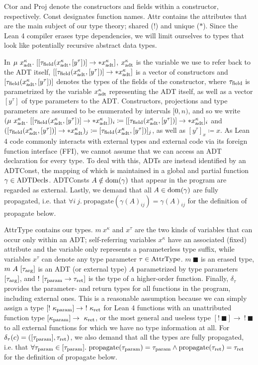 Ctor and Proj denote the constructors and fields within a constructor, respectively. Const designates function names. Attr contains the attributes that are the main subject of our type theory; shared (!) and unique ($*$). Since the Lean 4 compiler erases type dependencies, we will limit ourselves to types that look like potentially recursive abstract data types.

\sloppy In $\mu\ x^\kappa_\adt.\ [[\tau_\field(x^\kappa_\adt, [y^\tau])] \to *x^\kappa_\adt]$, $x^\kappa_{\mathrm{adt}}$ is the variable we use to refer back to the ADT itself, $[[\tau_{\mathrm{field}}(x^\kappa_{\mathrm{adt}}, [y^\tau])] \to *x^\kappa_{\mathrm{adt}}]$ is a vector of constructors and $[\tau_{\mathrm{field}}(x^\kappa_{\mathrm{adt}}, [y^\tau])]$ denotes the types of the fields of the constructor, where $\tau_{\mathrm{field}}$ is parametrized by the variable $x^\kappa_{\mathrm{adt}}$ representing the ADT itself, as well as a vector $[y^\tau]$ of type parameters to the ADT. Constructors, projections and type parameters are assumed to be enumerated by intervals $[0, n)$, and so we write $(\mu\ x^\kappa_\adt.\ [[\tau_\field(x^\kappa_\adt, [y^\tau])] \to *x^\kappa_\adt])_i \coloneqq [[\tau_\field(x^\kappa_\adt, [y^\tau])] \to *x^\kappa_\adt]_i$ and $([\tau_{\mathrm{field}}(x^\kappa_{\mathrm{adt}}, [y^\tau])] \to *x^\kappa_{\mathrm{adt}})_j \coloneqq [\tau_{\mathrm{field}}(x^\kappa_{\mathrm{adt}}, [y^\tau])]_j$, as well as $[y^\tau]_x \coloneqq x$. As Lean 4 code commonly interacts with external types and external code via its foreign function interface (FFI), we cannot assume that we can access an ADT declaration for every type. To deal with this, ADTs are instead identified by an ADTConst, the mapping of which is maintained in a global and partial function $\gamma \in \mathrm{ADTDecls}$. ADTConsts $A \notin \mathrm{dom}(\gamma)$ that appear in the program are regarded as external. Lastly, we demand that all $A \in \mathrm{dom}(\gamma)$ are fully propagated, i.e. that $\forall i\ j.\ \mathrm{propagate}(\gamma(A)_{ij}) = \gamma(A)_{ij}$ for the definition of propagate below.

AttrType contains our types. $m\ x^\kappa$ and $x^\tau$ are the two kinds of variables that can occur only within an ADT; self-referring variables $x^\kappa$ have an associated (fixed) attribute and the variable only represents a parameterless type suffix, while variables $x^\tau$ can denote any type parameter $\tau \in \mathrm{AttrType}$. $m\ \blacksquare$ is an erased type, $m\ A\ [\tau_{\mathrm{arg}}]$ is an ADT (or external type) $A$ parametrized by type parameters $[\tau_{\mathrm{arg}}]$, and $!\ [\tau_{\mathrm{param}} \to \tau_{\mathrm{ret}}]$ is the type of a higher-order function. Finally, $\delta_\tau$ provides the parameter- and return types for all functions in the program, including external ones. This is a reasonable assumption because we can simply assign a type $[!\ \kappa_\param] \to \ !\ \kappa_\ret$ for Lean 4 functions with an unattributed function type $[\kappa_{\mathrm{param}}] \to \ \kappa_{\mathrm{ret}}$, or the most general and useless type $[!\ \blacksquare] \to \ !\ \blacksquare$ to all external functions for which we have no type information at all. For $\delta_\tau(c) = ([\tau_{\mathrm{param}}], \tau_{\mathrm{ret}})$, we also demand that all the types are fully propagated, i.e. that $\forall \tau_{\mathrm{param}} \in [\tau_{\mathrm{param}}].\ \mathrm{propagate}(\tau_{\mathrm{param}}) = \tau_{\mathrm{param}} \land \mathrm{propagate}(\tau_{\mathrm{ret}}) = \tau_{\mathrm{ret}}$ for the definition of propagate below.

